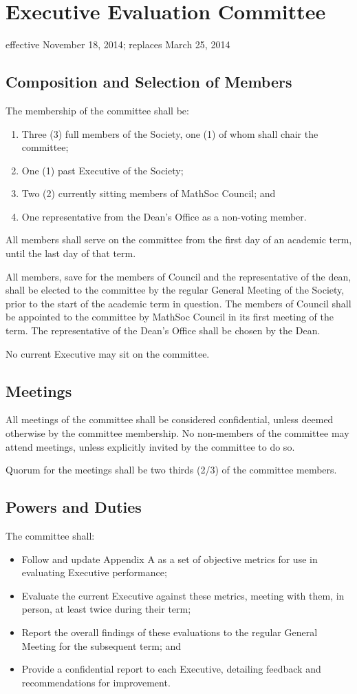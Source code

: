 \section{Executive Evaluation Committee}
effective November 18, 2014; replaces March 25, 2014

\subsection{Composition and Selection of Members}
The membership of the committee shall be:
\begin{enumerate}
\item Three (3) full members of the Society, one (1) of whom shall chair the committee;
\item One (1) past Executive of the Society;
\item Two (2) currently sitting members of MathSoc Council; and
\item One representative from the Dean’s Office as a non-voting member.
\end{enumerate}

All members shall serve on the committee from the first day of an academic term, until the last day of that term.

All members, save for the members of Council and the representative of the dean, shall be elected to the committee by the regular General Meeting of the Society, prior to the start of the academic term in question. The members of Council shall be appointed to the committee by MathSoc Council in its first meeting of the term. The representative of the Dean’s Office shall be chosen by the Dean.

No current Executive may sit on the committee.

\subsection{Meetings}

All meetings of the committee shall be considered confidential, unless deemed otherwise by the committee membership. No non-members of the committee may attend meetings, unless explicitly invited by the committee to do so.

Quorum for the meetings shall be two thirds (2/3) of the committee members.

\subsection{Powers and Duties}

The committee shall:
\begin{itemize}
\item Follow and update Appendix A as a set of objective metrics for use in evaluating Executive performance;
\item Evaluate the current Executive against these metrics, meeting with them, in person, at least twice during their term;
\item Report the overall findings of these evaluations to the regular General Meeting for the subsequent term; and
\item Provide a confidential report to each Executive, detailing feedback and recommendations for improvement.
\end{itemize}
